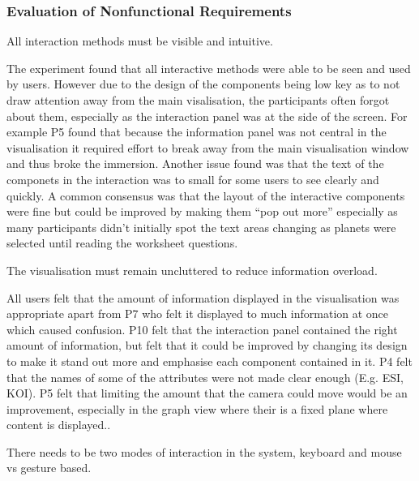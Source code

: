 \subsubsection{Evaluation of Nonfunctional Requirements}
\begin{enumerate}
 {\bf\item[R6.] All interaction methods must be visible and intuitive.}
 
The experiment found that all interactive methods were able to be seen and used
by users. However due to the design of the components being low key as to not
draw attention away from the main visalisation, the participants often forgot
about them, especially as the interaction panel was at the side of the screen.
For example P5 found that because the information panel was not central in the
visualisation
it required effort to break away from the main visualisation window and thus broke
the immersion. Another issue found was that the text of the componets in the
interaction was to small for some users to see clearly and quickly.
A common consensus was that the layout of the interactive components were fine
but could be improved by making them ``pop out more'' especially as many
participants didn't initially spot the text areas changing as planets were selected
until reading the worksheet questions.
 
{\bf \item[R7.] The visualisation must remain uncluttered to reduce information
overload.}

All users felt that the amount of information displayed in the
visualisation was appropriate apart from P7 who felt
it displayed to much information at once which caused confusion. P10 felt that
the interaction panel contained the right amount of information, but felt that
it could be improved by changing its design to make it stand out more and
emphasise each component contained in it. P4 felt that the names of some of the
attributes were not made clear enough (E.g. ESI, KOI). P5 felt that limiting the
amount that the camera could move would be an improvement,
especially in the graph view where their is a fixed plane where content is displayed..

{\bf \item[R8.]  There needs to be two modes of interaction in the system,
keyboard and mouse vs gesture based.}


\end{enumerate}
